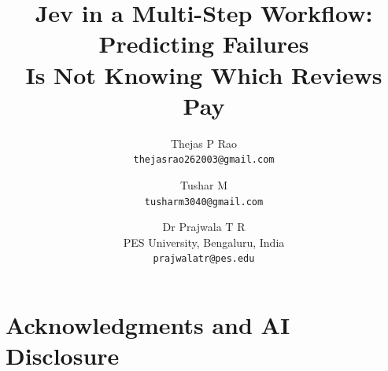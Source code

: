 \documentclass[11pt]{article}
\title{Jev in a Multi-Step Workflow: Predicting Failures\\
Is Not Knowing Which Reviews Pay}
\author{Thejas P Rao\\ \texttt{thejasrao262003@gmail.com}
  \and Tushar M\\ \texttt{tusharm3040@gmail.com}
  \and Dr Prajwala T R\\ PES University, Bengaluru, India\\ \texttt{prajwalatr@pes.edu}}
\date{}
\begin{document}
\maketitle
\begin{abstract}

\end{abstract}

\section*{Acknowledgments and AI Disclosure}

\FloatBarrier


\appendix

\end{document}
